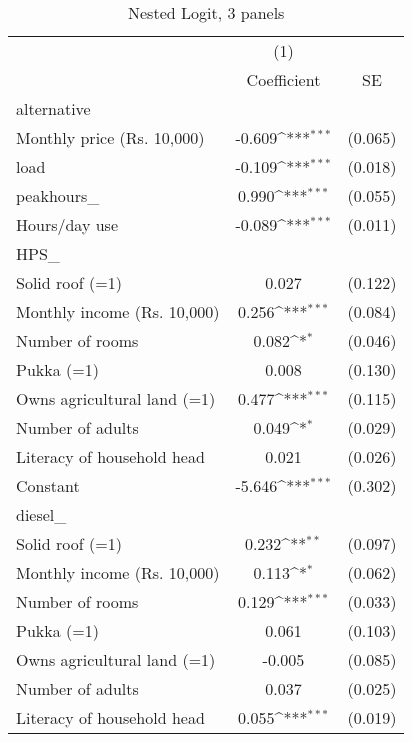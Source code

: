 \begin{table}[htbp]\centering
\def\sym#1{\ifmmode^{#1}\else\(^{#1}\)\fi}
\caption{Nested Logit, 3 panels}
\begin{tabular}{l*{1}{cc}}
\toprule
                    &\multicolumn{1}{c}{(1)}         &            \\
                    & Coefficient         &          SE\\
\midrule
alternative         &                     &            \\
Monthly price (Rs. 10,000)&      -0.609\sym{***}&     (0.065)\\
load                &      -0.109\sym{***}&     (0.018)\\
peakhours\_          &       0.990\sym{***}&     (0.055)\\
Hours/day use       &      -0.089\sym{***}&     (0.011)\\
\midrule
HPS\_                &                     &            \\
Solid roof (=1)     &       0.027         &     (0.122)\\
Monthly income (Rs. 10,000)&       0.256\sym{***}&     (0.084)\\
Number of rooms     &       0.082\sym{*}  &     (0.046)\\
Pukka (=1)          &       0.008         &     (0.130)\\
Owns agricultural land (=1)&       0.477\sym{***}&     (0.115)\\
Number of adults    &       0.049\sym{*}  &     (0.029)\\
Literacy of household head&       0.021         &     (0.026)\\
Constant            &      -5.646\sym{***}&     (0.302)\\
\midrule
diesel\_             &                     &            \\
Solid roof (=1)     &       0.232\sym{**} &     (0.097)\\
Monthly income (Rs. 10,000)&       0.113\sym{*}  &     (0.062)\\
Number of rooms     &       0.129\sym{***}&     (0.033)\\
Pukka (=1)          &       0.061         &     (0.103)\\
Owns agricultural land (=1)&      -0.005         &     (0.085)\\
Number of adults    &       0.037         &     (0.025)\\
Literacy of household head&       0.055\sym{***}&     (0.019)\\

\end{tabular}
\end{table}
